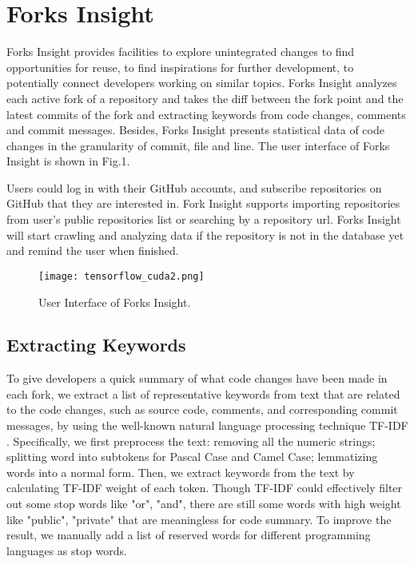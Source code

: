 \section{Forks Insight}

Forks Insight provides facilities to explore unintegrated changes to find opportunities for reuse, to find inspirations for further development, to potentially connect developers working on similar topics.
%
Forks Insight analyzes each active fork of a repository and takes the diff between the fork point and the latest commits   of the fork and extracting keywords from code changes, comments and commit messages.
%
Besides, Forks Insight presents statistical data of code changes in the granularity of commit, file and line. The user interface of Forks Insight is shown in Fig.1. 

Users could log in with their GitHub accounts, and subscribe repositories on GitHub that they are interested in. Fork Insight supports importing repositories from user's public repositories list or searching by a repository url. Forks Insight will start crawling and analyzing data if the repository is not in the database yet and remind the user when finished.

\begin{figure*}[ht]
\texttt{[image: tensorflow\_cuda2.png]}
\caption{User Interface of Forks Insight.}
\vspace{-6pt}
\label{GUI}
\end{figure*}

\subsection{Extracting Keywords}
To give developers a quick summary of what code changes have been made in each fork, we extract a list of representative keywords from text that are related to the code changes, such as source code, comments, and corresponding commit messages, by using the well-known natural language processing technique TF-IDF \cite{salton1988term}. Specifically, we first preprocess the text: removing all the numeric strings; splitting word into subtokens for Pascal Case and Camel Case; lemmatizing words into a normal form. Then, we extract keywords from the text by calculating TF-IDF weight of each token. Though TF-IDF could effectively filter out some stop words like "or", "and", there are still some words with high weight like "public", "private" that are meaningless for code summary. To improve the result, we manually add a list of  reserved words for different programming languages as stop words.

